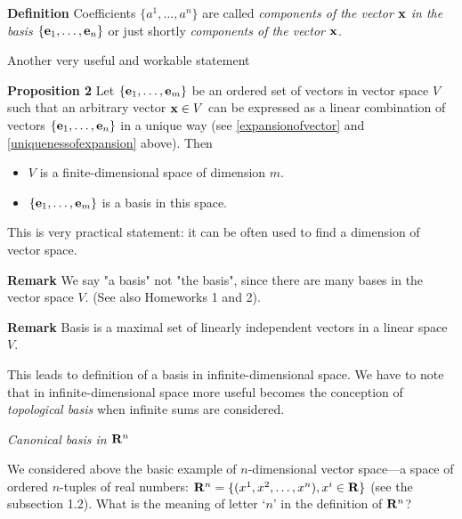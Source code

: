 \documentclass[12pt]{article}
\numberwithin{equation}{section}
\begin{document}
\m

 {\bf Definition}
 Coefficients $\{a^1,\dots,a^n\}$ are called {\it components of the vector ${\bf x}$ in the basis $\{{\bf e}_1,\dots,{\bf e}_n\}$}
 or just shortly {\it components of the vector ${\bf x}$}.

 \m

  Another very useful and workable statement



  {\bf Proposition 2}  Let  $\{{\bf e}_1,\dots,{\bf e}_m\}$ be an ordered set of vectors in vector space $V$ such that
  an arbitrary vector ${\bf x}\in V$ can be expressed as a linear combination of vectors
 $\{{\bf e}_1,\dots,{\bf e}_n\}$ in a unique way (see \eqref{expansionofvector} and \eqref{uniquenessofexpansion} above).
 Then

 \begin{itemize}

\item  $V$ is a finite-dimensional space of dimension $m$.

\item $\{{\bf e}_1,\dots,{\bf e}_m\}$ is a basis in this space.

\end{itemize}

This is very practical statement: it can be often used to find a 
dimension of vector space.


 {\bf Remark} We say "a basis" not "the basis", since 
there are many bases in the vector space $V$.
 (See also Homeworks 1 and 2).





{\bf Remark} Basis is a maximal set of  linearly independent vectors
in a linear space $V$.

\m

{\footnotesize  This leads to definition of
a basis  in infinite-dimensional space. We have to note that in infinite-dimensional space more useful becomes the conception of {\it topological basis}
when infinite sums are considered.}



{\it Canonical basis  in ${\bf R}^n$}

\m

We considered above  the basic example of $n$-dimensional vector space---a space
of ordered $n$-tuples of real numbers: ${\bf R}^n=\{(x^1,x^2,\dots,x^n),  x^i\in {\bf R}\}$
(see the subsection 1.2).
What is the meaning of letter `$n$' in the definition of ${\bf R}^n$?
\end{document}
